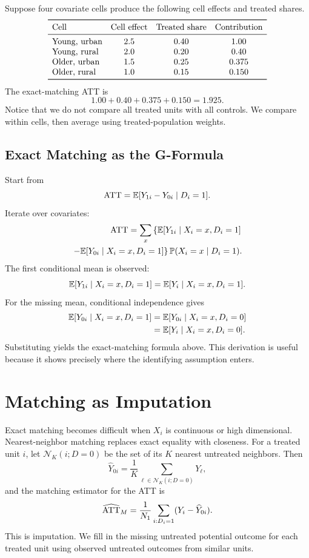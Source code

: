 \begin{exmp}
Suppose four covariate cells produce the following cell effects and treated
shares.
\[
\begin{array}{lccc}
\toprule
\text{Cell} & \text{Cell effect} & \text{Treated share} & \text{Contribution}\\
\midrule
\text{Young, urban} & 2.5 & 0.40 & 1.00\\
\text{Young, rural} & 2.0 & 0.20 & 0.40\\
\text{Older, urban} & 1.5 & 0.25 & 0.375\\
\text{Older, rural} & 1.0 & 0.15 & 0.150\\
\bottomrule
\end{array}
\]
The exact-matching ATT is
\[
    1.00+0.40+0.375+0.150=1.925.
\]
Notice that we do not compare all treated units with all controls. We compare
within cells, then average using treated-population weights.
\end{exmp}

\subsection{Exact Matching as the G-Formula}

Start from
\[
    \mathrm{ATT} = \mathbb{E}[Y_{1i}-Y_{0i}\mid D_i=1].
\]
Iterate over covariates:
\[
\begin{aligned}
    \mathrm{ATT}
    =
    \sum_x
    \left\{
    \mathbb{E}[Y_{1i}\mid X_i=x,D_i=1]\right.\\
    \left.
    -
    \mathbb{E}[Y_{0i}\mid X_i=x,D_i=1]
    \right\}
    \mathbb{P}(X_i=x\mid D_i=1).
\end{aligned}
\]
The first conditional mean is observed:
\[
    \mathbb{E}[Y_{1i}\mid X_i=x,D_i=1]=\mathbb{E}[Y_i\mid X_i=x,D_i=1].
\]
For the missing mean, conditional independence gives
\[
\begin{aligned}
    \mathbb{E}[Y_{0i}\mid X_i=x,D_i=1]
    &=
    \mathbb{E}[Y_{0i}\mid X_i=x,D_i=0]\\
    &=
    \mathbb{E}[Y_i\mid X_i=x,D_i=0].
\end{aligned}
\]
Substituting yields the exact-matching formula above. This derivation is useful
because it shows precisely where the identifying assumption enters.

\section{Matching as Imputation}

Exact matching becomes difficult when \(X_i\) is continuous or high
dimensional. Nearest-neighbor matching replaces exact equality with closeness.
For a treated unit \(i\), let \(\mathcal{N}_K(i;D=0)\) be the set of its
\(K\) nearest untreated neighbors. Then
\[
    \widehat Y_{0i}
    =
    \frac{1}{K}\sum_{\ell\in\mathcal{N}_K(i;D=0)}Y_\ell,
\]
and the matching estimator for the ATT is
\[
    \widehat{\mathrm{ATT}}_M
    =
    \frac{1}{N_1}\sum_{i:D_i=1}(Y_i-\widehat Y_{0i}).
\]
This is imputation. We fill in the missing untreated potential outcome for each
treated unit using observed untreated outcomes from similar units.

